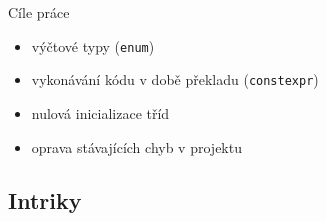 \documentclass[11pt]{beamer}
\begin{document}




\begin{frame}{Cíle práce}
\begin{itemize}
\pause \item výčtové typy (\texttt{enum})
\pause \item vykonávání kódu v době překladu (\texttt{constexpr})
\pause \item nulová inicializace tříd
\pause \item oprava stávajících chyb v projektu
\end{itemize}
\end{frame}

\subsection{Intriky}

\end{document}
